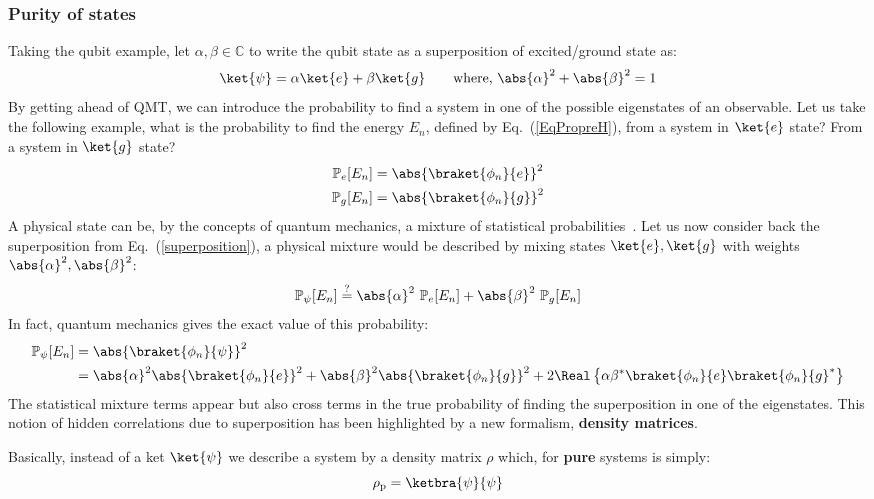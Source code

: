 \subsubsection{Purity of states}
Taking the qubit example, let $\alpha,\beta\in\mathbb{C}$ to write the qubit state as a superposition of excited/ground state as:
\begin{equation}\label{superposition}
    \ket{\psi} = \alpha\ket{e}+\beta\ket{g}\qquad\text{where, }\abs{\alpha}^2+\abs{\beta}^2=1 
\end{equation}
By getting ahead of QMT, we can introduce the probability to find a system in one of the possible eigenstates of an observable. Let us take the following example, what is the probability to find the energy $E_n$, defined by Eq.\ (\ref{EqPropreH}), from a system in $\ket{e}$ state? From a system in $\ket{g}$ state?
\begin{align}
    \mathbb{P}_e [E_n]&=\abs{\braket{\phi_n}{e}}^2\\
    \mathbb{P}_g [E_n]&=\abs{\braket{\phi_n}{g}}^2
\end{align}
A physical state can be, by the concepts of quantum mechanics, a mixture of statistical probabilities~\cite{CT}. Let us now consider back the superposition from Eq.\ (\ref{superposition}), a physical mixture would be described by mixing states $\ket{e},\ket{g}$ with weights $\abs{\alpha}^2,\abs{\beta}^2$:
\begin{equation}
    \mathbb{P}_\psi [E_n]\overset{?}{=}\abs{\alpha}^2~\mathbb{P}_e [E_n]+\abs{\beta}^2~\mathbb{P}_g [E_n]
\end{equation}
In fact, quantum mechanics gives the exact value of this probability:
\begin{align}
    \mathbb{P}_\psi [E_n]&=\abs{\braket{\phi_n}{\psi}}^2\\
    &= \abs{\alpha}^2\abs{\braket{\phi_n}{e}}^2+\abs{\beta}^2\abs{\braket{\phi_n}{g}}^2+2\Real\left\{\alpha\beta^*\braket{\phi_n}{e}\braket{\phi_n}{g}^*\right\}
\end{align}
The statistical mixture terms appear but also cross terms in the true probability of finding the superposition in one of the eigenstates. This notion of hidden correlations due to superposition has been highlighted by a new formalism, \textbf{density matrices}.\par
Basically, instead of a ket $\ket{\psi}$ we describe a system by a density matrix $\rho$ which, for \textbf{pure} systems is simply: 
\begin{equation}
    \rho_\text{p} = \ketbra{\psi}{\psi}
\end{equation}
